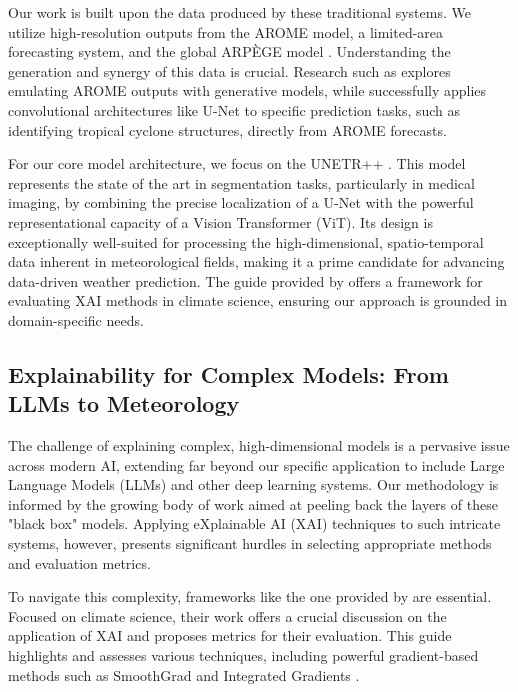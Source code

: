 Our work is built upon the data produced by these traditional systems. We utilize high-resolution outputs from the AROME model, a limited-area forecasting system, and the global ARPÈGE model \cite{arpege}. Understanding the generation and synergy of this data is crucial. Research such as \cite{gan-arome-brochet} explores emulating AROME outputs with generative models, while \cite{arome-tc-unet-raynaud} successfully applies convolutional architectures like U-Net to specific prediction tasks, such as identifying tropical cyclone structures, directly from AROME forecasts.

For our core model architecture, we focus on the UNETR++ \cite{unetrpp}. This model represents the state of the art in segmentation tasks, particularly in medical imaging, by combining the precise localization of a U-Net with the powerful representational capacity of a Vision Transformer (ViT). Its design is exceptionally well-suited for processing the high-dimensional, spatio-temporal data inherent in meteorological fields, making it a prime candidate for advancing data-driven weather prediction. The guide provided by \cite{guide-xai-bommer} offers a framework for evaluating XAI methods in climate science, ensuring our approach is grounded in domain-specific needs.

\subsection{Explainability for Complex Models: From LLMs to Meteorology}
The challenge of explaining complex, high-dimensional models is a pervasive issue across modern AI, extending far beyond our specific application to include Large Language Models (LLMs) and other deep learning systems. Our methodology is informed by the growing body of work aimed at peeling back the layers of these "black box" models. Applying eXplainable AI (XAI) techniques to such intricate systems, however, presents significant hurdles in selecting appropriate methods and evaluation metrics.

To navigate this complexity, frameworks like the one provided by \cite{guide-xai-bommer} are essential. Focused on climate science, their work offers a crucial discussion on the application of XAI and proposes metrics for their evaluation. This guide highlights and assesses various techniques, including powerful gradient-based methods such as SmoothGrad \cite{smooth-grad-smilkov} and Integrated Gradients \cite{integrated-grad-sundararajan}.

